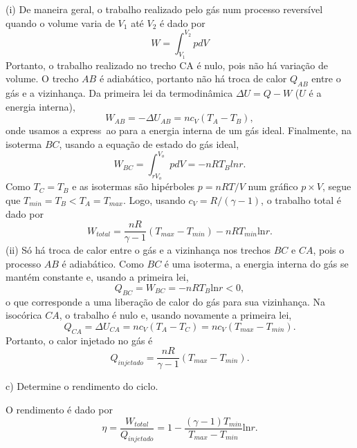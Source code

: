 \begin{enumerate}[start=1,label={\bfseries Q\arabic*.}]
\resposta (i) De maneira geral, o trabalho realizado pelo gás num processo reversível quando o volume varia de $V_{1}$ até $V_{2}$ é dado por
%
\begin{equation}
  W = \int_{V_{1}}^{V_{2}} p dV
\end{equation}
%
Portanto, o trabalho realizado no trecho CA é nulo, pois não há variação de volume. O trecho $AB$ é adiabático, portanto não há troca de calor $Q_{AB}$ entre o gás e a vizinhança. Da primeira lei da termodinâmica $ \Delta U = Q - W $ ($U$ é a energia interna),
%
\begin{equation}
  W_{AB} = - \Delta U_{AB} = nc_{V} (T_{A} - T_{B}) ,
\end{equation}
%
onde usamos a express~ao para a energia interna de um gás ideal. Finalmente, na isoterma $BC$, usando a equação de estado do gás ideal,
%
\begin{equation}
  W_{BC} = \int_{rV_{o}}^{V_{o}} p dV = - n R T_{B} ln r .
\end{equation}
%
Como $T_{C} = T_{B}$ e as isotermas são hipérboles $ p = n R T / V $ num gráfico $p \times V$, segue que $T_{min} = T_{B} < T_{A} = T_{max}$. Logo, usando $c_{V} = R/ (\gamma - 1) $, o trabalho total é dado por
%
\begin{equation}
  W_{total} = \frac{nR}{\gamma - 1} (T_{max} - T_{min}) - n R T_{min} \mbox{ln} r .
\end{equation}
%
(ii) Só há troca de calor entre o gás e a vizinhança nos trechos $BC$ e $CA$, pois o processo $AB$ é adiabático. Como $BC$ é uma isoterma, a energia interna do gás se mantém constante e, usando a primeira lei,
%
\begin{equation}
  Q_{BC} = W_{BC} = -nRT_{B} \mbox{ln} r < 0 ,
\end{equation}
%
o que corresponde a uma liberação de calor do gás para sua vizinhança. Na isocórica $CA$, o trabalho é nulo e, usando novamente a primeira lei,
%
\begin{equation}
  Q_{CA} = \Delta U_{CA} = nc_{V} (T_{A} - T_{C}) = n c_{V} (T_{max} - T_{min}) .
\end{equation}
%
Portanto, o calor injetado no gás é
%
\begin{equation}
  Q_{injetado} = \frac{nR}{\gamma - 1} (T_{max} - T_{min}) .
\end{equation}
%



c) Determine o rendimento do ciclo.

\resposta O rendimento é dado por
%
\begin{equation}
  \eta = \frac{W_{total}}{Q_{injetado}} = 1 - \frac{ (\gamma - 1) T_{min} }{T_{max} - T_{min}} \mbox{ln} r .
\end{equation}
%



\end{enumerate}
